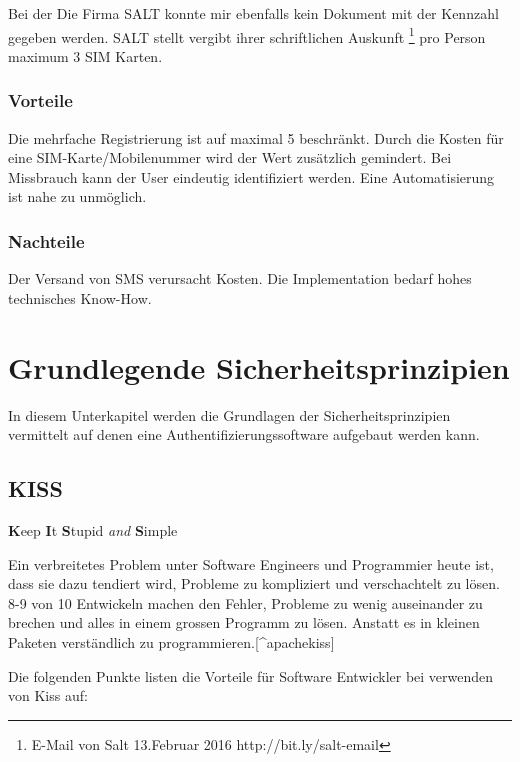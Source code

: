 Bei der Die Firma SALT konnte mir ebenfalls kein Dokument mit der
Kennzahl gegeben werden. SALT stellt vergibt ihrer schriftlichen
Auskunft \footnote{E-Mail von Salt 13.Februar 2016
  http://bit.ly/salt-email} pro Person maximum 3 SIM Karten.

\subsubsection{Vorteile}\label{vorteile-2}

Die mehrfache Registrierung ist auf maximal 5 beschränkt. Durch die
Kosten für eine SIM-Karte/Mobilenummer wird der Wert zusätzlich
gemindert. Bei Missbrauch kann der User eindeutig identifiziert werden.
Eine Automatisierung ist nahe zu unmöglich.

\subsubsection{Nachteile}\label{nachteile-2}

Der Versand von SMS verursacht Kosten. Die Implementation bedarf hohes
technisches Know-How.

\newpage

\section{Grundlegende
Sicherheitsprinzipien}\label{grundlegende-sicherheitsprinzipien}

In diesem Unterkapitel werden die Grundlagen der Sicherheitsprinzipien
vermittelt auf denen eine Authentifizierungssoftware aufgebaut werden
kann.

\subsection{KISS}\label{kiss}

\textbf{K}eep \textbf{I}t \textbf{S}tupid \emph{and} \textbf{S}imple

Ein verbreitetes Problem unter Software Engineers und Programmier heute
ist, dass sie dazu tendiert wird, Probleme zu kompliziert und
verschachtelt zu lösen. 8-9 von 10 Entwickeln machen den Fehler,
Probleme zu wenig auseinander zu brechen und alles in einem grossen
Programm zu lösen. Anstatt es in kleinen Paketen verständlich zu
programmieren.{[}\^{}apachekiss{]}

Die folgenden Punkte listen die Vorteile für Software Entwickler bei
verwenden von Kiss auf:

